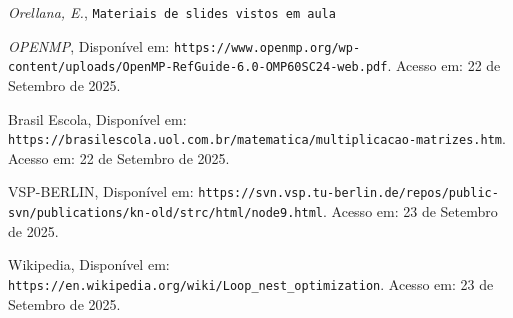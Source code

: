 \documentclass[12pt, a4paper]{article}
\begin{document}
	\newpage
	\begin{thebibliography}{9}
		 \textit{Orellana, E.}, \texttt{Materiais de slides vistos em aula}

		 \textit{OPENMP}, Disponível em: \texttt{https://www.openmp.org/wp-content/uploads/OpenMP-RefGuide-6.0-OMP60SC24-web.pdf}. Acesso em: 22 de Setembro de 2025.

		 Brasil Escola, Disponível em: \texttt{https://brasilescola.uol.com.br/matematica/multiplicacao-matrizes.htm}. Acesso em: 22 de Setembro de 2025.

		 VSP-BERLIN, Disponível em: \texttt{https://svn.vsp.tu-berlin.de/repos/public-svn/publications/kn-old/strc/html/node9.html}. Acesso em: 23 de Setembro de 2025.

		 Wikipedia, Disponível em: \texttt{https://en.wikipedia.org/wiki/Loop\_nest\_optimization}. Acesso em: 23 de Setembro de 2025.
	\end{thebibliography}
\end{document}
